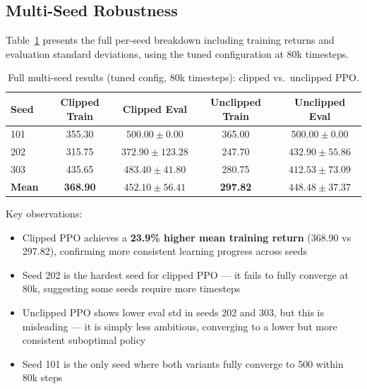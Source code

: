 \documentclass[12pt,a4paper]{article}
\begin{document}
\subsection{Multi-Seed Robustness}

Table~\ref{tab:seeds} presents the full per-seed breakdown including training returns and evaluation standard deviations, using the tuned configuration at 80k timesteps.

\begin{table}[H]
\centering
\caption{Full multi-seed results (tuned config, 80k timesteps): clipped vs.\ unclipped PPO.}
\label{tab:seeds}
\begin{tabular}{lcccc}
\toprule
\textbf{Seed} & \textbf{Clipped Train} & \textbf{Clipped Eval} & \textbf{Unclipped Train} & \textbf{Unclipped Eval} \\
\midrule
101 & 355.30 & $500.00 \pm 0.00$   & 365.00 & $500.00 \pm 0.00$   \\
202 & 315.75 & $372.90 \pm 123.28$ & 247.70 & $432.90 \pm 55.86$  \\
303 & 435.65 & $483.40 \pm 41.80$  & 280.75 & $412.53 \pm 73.09$  \\
\midrule
\textbf{Mean} & \textbf{368.90} & $\mathbf{452.10 \pm 56.41}$ & \textbf{297.82} & $\mathbf{448.48 \pm 37.37}$ \\
\bottomrule
\end{tabular}
\end{table}

Key observations:
\begin{itemize}[noitemsep]
    \item Clipped PPO achieves a \textbf{23.9\% higher mean training return} (368.90 vs 297.82), confirming more consistent learning progress across seeds
    \item Seed 202 is the hardest seed for clipped PPO --- it fails to fully converge at 80k, suggesting some seeds require more timesteps
    \item Unclipped PPO shows lower eval std in seeds 202 and 303, but this is misleading --- it is simply less ambitious, converging to a lower but more consistent suboptimal policy
    \item Seed 101 is the only seed where both variants fully converge to 500 within 80k steps
\end{itemize}
\end{document}
